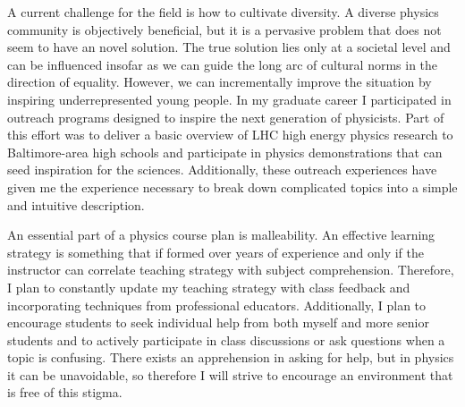 \documentclass[12pt]{article}
\begin{document}
A current challenge for the field is how to cultivate diversity. A diverse physics
community is objectively beneficial, but it is a pervasive problem that does not
seem to have an novel solution. The true solution lies only at a societal level
and can be influenced insofar as we can guide the long arc of cultural norms in
the direction of equality. However, we can incrementally improve the situation by
inspiring underrepresented young people. In my graduate career I participated in
outreach programs designed to inspire the next generation of physicists. Part of
this effort was to deliver a basic overview of LHC high energy physics research to
Baltimore-area high schools and participate in physics demonstrations that can seed
inspiration for the sciences. Additionally, these outreach experiences have given
me the experience necessary to break down complicated topics into a simple and
intuitive description.

An essential part of a physics course plan is malleability. An effective learning
strategy is something that if formed over years of experience and only if the
instructor can correlate teaching strategy with subject comprehension. Therefore,
I plan to constantly update my teaching strategy with class feedback and incorporating
techniques from professional educators. Additionally, I plan to encourage students
to seek individual help from both myself and more senior students and to actively
participate in class discussions or ask questions when a topic is confusing.
There exists an apprehension in asking for help, but in physics it can be unavoidable,
so therefore I will strive to encourage an environment that is free of this stigma.
\end{document}
